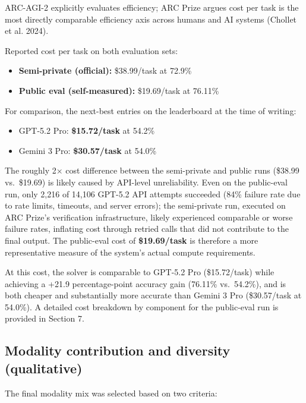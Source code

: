 \documentclass[11pt]{article}
\providecommand{\tightlist}{%
  \setlength{\itemsep}{0pt}\setlength{\parskip}{0pt}}
\begin{document}
ARC-AGI-2 explicitly evaluates efficiency; ARC Prize argues cost per
task is the most directly comparable efficiency axis across humans and
AI systems (Chollet et al. 2024).

Reported cost per task on both evaluation sets:

\begin{itemize}
\tightlist
\item
  \textbf{Semi-private (official):} \$38.99/task at 72.9\%
\item
  \textbf{Public eval (self-measured):} \$19.69/task at 76.11\%
\end{itemize}

For comparison, the next-best entries on the leaderboard at the time of
writing:

\begin{itemize}
\tightlist
\item
  GPT-5.2 Pro: \textbf{\$15.72/task} at 54.2\%
\item
  Gemini 3 Pro: \textbf{\$30.57/task} at 54.0\%
\end{itemize}

The roughly 2× cost difference between the semi-private and public runs
(\$38.99 vs.~\$19.69) is likely caused by API-level unreliability. Even
on the public-eval run, only 2,216 of 14,106 GPT-5.2 API attempts
succeeded (84\% failure rate due to rate limits, timeouts, and server
errors); the semi-private run, executed on ARC Prize's verification
infrastructure, likely experienced comparable or worse failure rates,
inflating cost through retried calls that did not contribute to the
final output. The public-eval cost of \textbf{\$19.69/task} is therefore
a more representative measure of the system's actual compute
requirements.

At this cost, the solver is comparable to GPT-5.2 Pro (\$15.72/task)
while achieving a +21.9 percentage-point accuracy gain (76.11\%
vs.~54.2\%), and is both cheaper and substantially more accurate than
Gemini 3 Pro (\$30.57/task at 54.0\%). A detailed cost breakdown by
component for the public-eval run is provided in Section 7.

\hypertarget{modality-contribution-and-diversity-qualitative}{%
\subsection{Modality contribution and diversity
(qualitative)}\label{modality-contribution-and-diversity-qualitative}}

The final modality mix was selected based on two criteria:
\end{document}
